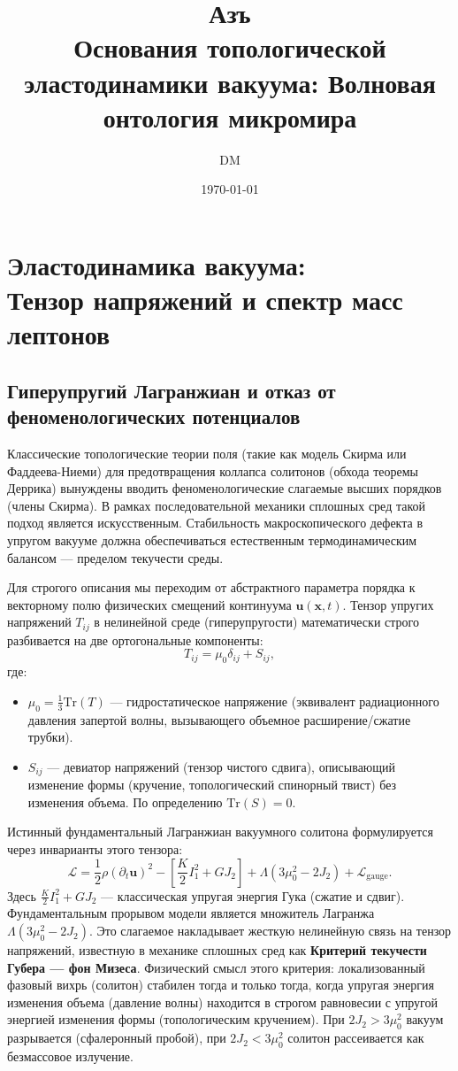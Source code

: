 \documentclass[11pt,a4paper]{article}
\title{\textbf{Азъ\\ Основания топологической эластодинамики вакуума: Волновая онтология микромира}}
\author{DM}
\date{\today}
\begin{document}
	
\section{Эластодинамика вакуума:\\ Тензор напряжений и спектр масс лептонов}

\subsection{Гиперупругий Лагранжиан и отказ от феноменологических потенциалов}
Классические топологические теории поля (такие как модель Скирма или Фаддеева-Ниеми) для предотвращения коллапса солитонов (обхода теоремы Деррика) вынуждены вводить феноменологические слагаемые высших порядков (члены Скирма). В рамках последовательной механики сплошных сред такой подход является искусственным. Стабильность макроскопического дефекта в упругом вакууме должна обеспечиваться естественным термодинамическим балансом — пределом текучести среды.

Для строгого описания мы переходим от абстрактного параметра порядка к векторному полю физических смещений континуума $\mathbf{u}(\mathbf{x}, t)$. Тензор упругих напряжений $T_{ij}$ в нелинейной среде (гиперупругости) математически строго разбивается на две ортогональные компоненты:
\begin{equation}
	T_{ij} = \mu_0 \delta_{ij} + S_{ij},
\end{equation}
где:
\begin{itemize}
	\item $\mu_0 = \frac{1}{3}\text{Tr}(T)$ — гидростатическое напряжение (эквивалент радиационного давления запертой волны, вызывающего объемное расширение/сжатие трубки).
	\item $S_{ij}$ — девиатор напряжений (тензор чистого сдвига), описывающий изменение формы (кручение, топологический спинорный твист) без изменения объема. По определению $\text{Tr}(S) = 0$.
\end{itemize}

Истинный фундаментальный Лагранжиан вакуумного солитона формулируется через инварианты этого тензора:
\begin{equation}
	\mathcal{L} = \frac{1}{2} \rho (\partial_t \mathbf{u})^2 - \left[ \frac{K}{2} I_1^2 + G J_2 \right] + \Lambda \left( 3\mu_0^2 - 2J_2 \right) + \mathcal{L}_{\text{gauge}}.
\end{equation}
Здесь $\frac{K}{2} I_1^2 + G J_2$ — классическая упругая энергия Гука (сжатие и сдвиг). 
Фундаментальным прорывом модели является множитель Лагранжа $\Lambda \left( 3\mu_0^2 - 2J_2 \right)$. Это слагаемое накладывает жесткую нелинейную связь на тензор напряжений, известную в механике сплошных сред как \textbf{Критерий текучести Губера — фон Мизеса}. 
Физический смысл этого критерия: локализованный фазовый вихрь (солитон) стабилен тогда и только тогда, когда упругая энергия изменения объема (давление волны) находится в строгом равновесии с упругой энергией изменения формы (топологическим кручением). При $2J_2 > 3\mu_0^2$ вакуум разрывается (сфалеронный пробой), при $2J_2 < 3\mu_0^2$ солитон рассеивается как безмассовое излучение.
\end{document}
